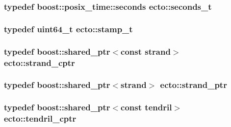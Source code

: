 \hypertarget{namespaceecto_ae14f91b3661ad9cb774590b15407742c}{
\subsubsection[{seconds\-\_\-t}]{\setlength{\rightskip}{0pt plus 5cm}typedef boost\-::posix\-\_\-time\-::seconds {\bf ecto\-::seconds\-\_\-t}}}\label{namespaceecto_ae14f91b3661ad9cb774590b15407742c}
\hypertarget{namespaceecto_a96ba8fa498cc4b8e2a0217a9e236b50d}{
\subsubsection[{stamp\-\_\-t}]{\setlength{\rightskip}{0pt plus 5cm}typedef uint64\-\_\-t {\bf ecto\-::stamp\-\_\-t}}}\label{namespaceecto_a96ba8fa498cc4b8e2a0217a9e236b50d}
\hypertarget{namespaceecto_abbad20d834739bbf762269e4e04a6732}{
\subsubsection[{strand\-\_\-cptr}]{\setlength{\rightskip}{0pt plus 5cm}typedef boost\-::shared\-\_\-ptr$<$const {\bf strand}$>$ {\bf ecto\-::strand\-\_\-cptr}}}\label{namespaceecto_abbad20d834739bbf762269e4e04a6732}
\hypertarget{namespaceecto_a98ca3b7b690de778292922c806e7588d}{
\subsubsection[{strand\-\_\-ptr}]{\setlength{\rightskip}{0pt plus 5cm}typedef boost\-::shared\-\_\-ptr$<${\bf strand}$>$ {\bf ecto\-::strand\-\_\-ptr}}}\label{namespaceecto_a98ca3b7b690de778292922c806e7588d}
\hypertarget{namespaceecto_ad01f26ee47597f71a6f86ee34bb3ffe4}{
\subsubsection[{tendril\-\_\-cptr}]{\setlength{\rightskip}{0pt plus 5cm}typedef boost\-::shared\-\_\-ptr$<$const {\bf tendril}$>$ {\bf ecto\-::tendril\-\_\-cptr}}}\label{namespaceecto_ad01f26ee47597f71a6f86ee34bb3ffe4}
